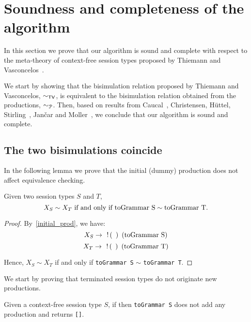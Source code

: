 \section{Soundness and completeness of the algorithm}
\label{sec:soundness}

In this section we prove that our algorithm is sound and complete 
with respect to the meta-theory of context-free session types proposed 
by Thiemann and Vasconcelos~\cite{thiemann2016context}.

We start by showing that the bisimulation relation proposed by 
Thiemann and Vasconcelos, $\sim_{\mathsf{TV}}$, is equivalent to the 
bisimulation relation obtained from the productions, $\sim_{\mathcal{P}}$. 
Then, based on results from Caucal~\cite{caucal1986decidabilite}, Christensen, 
H{\"{u}}ttel, Stirling~\cite{DBLP:journals/iandc/ChristensenHS95}, Jan{\v{c}}ar 
and Moller~\cite{janvcar1999techniques}, we conclude that our algorithm 
is sound and complete.

\subsection{The two bisimulations coincide}

In the following lemma we prove that the initial (dummy) production 
does not affect equivalence checking.
\begin{lemma}
	Given two session types $S$ and $T$, 
	\[ X_{S} \sim X_{T}  \text{ if and only if } 
	\text{\lstinline{toGrammar S}} \sim \text{\lstinline{toGrammar T}}.\]
\end{lemma}

\begin{proof}
	By~\eqref{initial_prod}, we have:
	\[X_S \rightarrow \enspace \initialProd\enspace \text{(\lstinline{toGrammar S})}\]
    \[X_T \rightarrow \enspace \initialProd\enspace \text{(\lstinline{toGrammar T})}\]

Hence, $X_S\sim X_T$ if and only if 
\lstinline{toGrammar S} $\sim$ \lstinline{toGrammar T}.
\end{proof}

We start by proving that terminated session types
do not originate new productions.

\begin{lemma}
\label{lemma:terminated_session}
	Given a context-free session type $S$, 
	if  then \lstinline{toGrammar S} does not add any 
	production and returns \lstinline{[]}.
\end{lemma}

